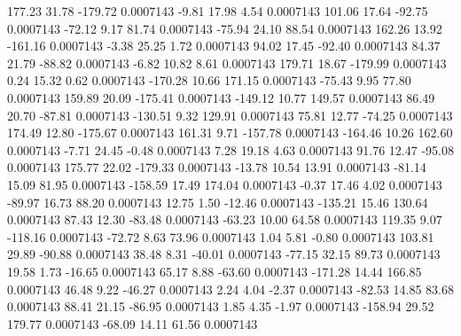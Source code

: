      177.23       31.78     -179.72     0.0007143
       -9.81       17.98        4.54     0.0007143
      101.06       17.64      -92.75     0.0007143
      -72.12        9.17       81.74     0.0007143
      -75.94       24.10       88.54     0.0007143
      162.26       13.92     -161.16     0.0007143
       -3.38       25.25        1.72     0.0007143
       94.02       17.45      -92.40     0.0007143
       84.37       21.79      -88.82     0.0007143
       -6.82       10.82        8.61     0.0007143
      179.71       18.67     -179.99     0.0007143
        0.24       15.32        0.62     0.0007143
     -170.28       10.66      171.15     0.0007143
      -75.43        9.95       77.80     0.0007143
      159.89       20.09     -175.41     0.0007143
     -149.12       10.77      149.57     0.0007143
       86.49       20.70      -87.81     0.0007143
     -130.51        9.32      129.91     0.0007143
       75.81       12.77      -74.25     0.0007143
      174.49       12.80     -175.67     0.0007143
      161.31        9.71     -157.78     0.0007143
     -164.46       10.26      162.60     0.0007143
       -7.71       24.45       -0.48     0.0007143
        7.28       19.18        4.63     0.0007143
       91.76       12.47      -95.08     0.0007143
      175.77       22.02     -179.33     0.0007143
      -13.78       10.54       13.91     0.0007143
      -81.14       15.09       81.95     0.0007143
     -158.59       17.49      174.04     0.0007143
       -0.37       17.46        4.02     0.0007143
      -89.97       16.73       88.20     0.0007143
       12.75        1.50      -12.46     0.0007143
     -135.21       15.46      130.64     0.0007143
       87.43       12.30      -83.48     0.0007143
      -63.23       10.00       64.58     0.0007143
      119.35        9.07     -118.16     0.0007143
      -72.72        8.63       73.96     0.0007143
        1.04        5.81       -0.80     0.0007143
      103.81       29.89      -90.88     0.0007143
       38.48        8.31      -40.01     0.0007143
      -77.15       32.15       89.73     0.0007143
       19.58        1.73      -16.65     0.0007143
       65.17        8.88      -63.60     0.0007143
     -171.28       14.44      166.85     0.0007143
       46.48        9.22      -46.27     0.0007143
        2.24        4.04       -2.37     0.0007143
      -82.53       14.85       83.68     0.0007143
       88.41       21.15      -86.95     0.0007143
        1.85        4.35       -1.97     0.0007143
     -158.94       29.52      179.77     0.0007143
      -68.09       14.11       61.56     0.0007143
